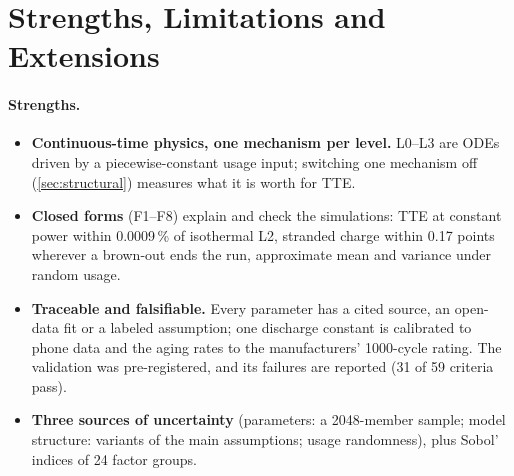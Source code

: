 \section{Strengths, Limitations and Extensions}\label{sec:discussion}

\paragraph{Strengths.}
\begin{itemize}
  \item \textbf{Continuous-time physics, one mechanism per level.} L0--L3 are ODEs driven by a piecewise-constant
  usage input; switching one mechanism off (\cref{sec:structural}) measures what it is worth for TTE.
  \item \textbf{Closed forms} (F1--F8) explain and check the simulations: TTE at constant power within
  0.0009\,\% of isothermal L2, stranded charge within 0.17 points wherever a brown-out ends the run, approximate
  mean and variance under random usage.
  \item \textbf{Traceable and falsifiable.} Every parameter has a cited source, an open-data fit or a labeled
  assumption; one discharge constant is calibrated to phone data and the aging rates to the manufacturers'
  1000-cycle rating. The validation was pre-registered, and its failures are reported (31 of 59 criteria pass).
  \item \textbf{Three sources of uncertainty} (parameters: a 2048-member sample; model structure: variants of the
  main assumptions; usage randomness), plus Sobol' indices of 24 factor groups.
\end{itemize}

